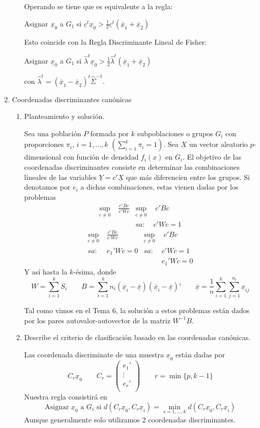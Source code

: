 \documentclass[twoside]{article}
\newcommand{\media}[1]{{\overline{#1}}}
\newcommand{\muestra}[1]{{\underline{#1}}}
\newcommand{\m}[1]{{\muestra{#1}}}
\begin{document}
\begin{enumerate}
\begin{enumerate}
\begin{sol}
	Operando se tiene que es equivalente a la regla:
	\begin{center}Asignar $\m{x}_0$ a $G_1$ si $\m{c}^t \m{x}_0 > \frac{1}{2} \m{c}^t (\m{\overline{x}}_1 + \m{\overline{x}}_2)$\end{center}
	Esto coincide con la Regla Discriminante Lineal de Fisher:
	\begin{center}Asignar $\m{x}_0$ a $G_1$ si $\widehat{\lambda}^t \m{x}_0 > \frac{1}{2} \widehat{\lambda}^t (\m{\overline{x}}_1 + \m{\overline{x}}_2)$\end{center}
	con $\widehat{\lambda}^t = (\m{\overline{x}}_1 - \m{\overline{x}}_2)^t \widehat{\Sigma}^{-1}$.
	\end{sol}
\end{enumerate}
\item Coordenadas discriminantes canónicas 
\begin{enumerate}
	\item Planteamiento y solución.
	
Sea una población $P$ formada por $k$ subpoblaciones o grupos  $G_i$ con proporciones $\pi_i$, $i=1,\dotsc,k$ $(\sum_{i=1}^k\pi_i = 1)$. Sea $\m{X}$ un vector aleatorio $p$-dimensional con función de densidad $f_i(x)$ en $G_i$. El objetivo de las coordenadas discriminantes consiste en determinar las combinaciones lineales de las variables $\m{Y}=c'\m{X}$ que más diferencien entre los grupos. Si denotamos por $e_i$ a dichas combinaciones, estas vienen dadas por los problemas
\begin{align*}
\sup_{c\neq 0}&\;\frac{c'Bc}{c'Wc} &\sup_{c\neq 0}&\;{c'Bc}\\
 & & sa:\;&c'Wc=1
\end{align*}
\begin{align*}
\sup_{c\neq 0}&\;\frac{c'Bc}{c'Wc} &\sup_{c\neq 0}&\;{c'Bc}\\
sa: &\;e_1' W c = 0 & sa:\;&c'Wc=1 \\
& & & e_1'Wc =0
\end{align*}
Y así hasta la $k$-ésima, donde
$$
W = \sum_{i=1}^k S_i \qquad B = \sum_{i=1}^k n_i (\m{\media{x}}_i-\muestra{\media{x}})(\m{\media{x}}_i-\muestra{\media{x}})' \qquad \m{\media{x}} = \frac{1}{n}\sum_{i=1}^k\sum_{j=1}^{n_i}\m{x}_{ij}
$$

Tal como vimos en el Tema $6$, la solución a estos problemas están dados por los pares autovalor-autovector de la matriz $W^{-1}B$.
	\item Describe el criterio de clasificación basado en las coordenadas canónicas.
	
	Las coordenada discriminate de una muestra $\m{x}_0$ están dadas por
	$$
	C_r \m{x}_0 \qquad C_r = \begin{pmatrix}
	e_1'\\
	\vdots \\
	e_r'\\
	\end{pmatrix} \qquad r=\min\{p,k-1\}
	$$
Nuestra regla consistirá en
$$
\text{Asignar $\m{x}_0$ a $G_i$ si }d(C_r\m{x}_0,C_r\m{x}_i) = \min_{s=1,\dotsc,k}d(C_r\m{x}_0,C_r\m{x}_i)
$$
Aunque generalmente solo utilizamos 2 coordenadas discriminantes.
\end{enumerate}
\end{enumerate}
\end{document}
